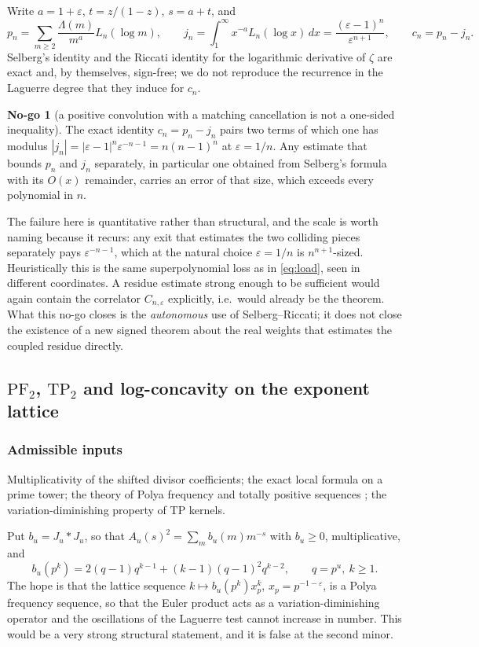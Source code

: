 \documentclass[11pt]{amsart}
\theoremstyle{definition}
\theoremstyle{remark}
\theoremstyle{definition}
\newtheorem{nogo}{No-go}[section]
\newcommand{\eps}{\varepsilon}
\begin{document}
Write $a=1+\eps$, $t=z/(1-z)$, $s=a+t$, and
\[
   p_n=\sum_{m\ge2}\frac{\Lambda(m)}{m^a}L_n(\log m),\qquad
   j_n=\int_1^\infty x^{-a}L_n(\log x)\,dx=\frac{(\eps-1)^n}{\eps^{n+1}},\qquad
   c_n=p_n-j_n .
\]
Selberg's identity and the Riccati identity for the logarithmic derivative of $\zeta$ are exact
and, by themselves, sign-free; we do not reproduce the recurrence in the Laguerre degree that
they induce for $c_n$.

\begin{nogo}[a positive convolution with a matching cancellation is not a one-sided
inequality]\label{ng:selberg}
The exact identity $c_n=p_n-j_n$ pairs two terms of which one has modulus
$|j_n|=|\eps-1|^n\eps^{-n-1}=n(n-1)^n$ at $\eps=1/n$. Any estimate that bounds $p_n$ and $j_n$
separately, in particular one obtained from Selberg's formula with its $O(x)$ remainder, carries
an error of that size, which exceeds every polynomial in $n$.
\end{nogo}

\noindent The failure here is quantitative rather than structural, and the scale is worth naming
because it recurs: any exit that estimates the two colliding pieces separately pays
$\eps^{-n-1}$, which at the natural choice $\eps=1/n$ is $n^{n+1}$-sized. Heuristically this is
the same superpolynomial loss as in \eqref{eq:load}, seen in different coordinates. A residue
estimate strong enough to be sufficient would again contain the correlator $C_{n,\eps}$
explicitly, i.e.\ would already be the theorem. What this no-go closes is the \emph{autonomous}
use of Selberg--Riccati; it does not close the existence of a new signed theorem about the real
weights that estimates the coupled residue directly.

\subsection{$\mathrm{PF}_2$, $\mathrm{TP}_2$ and log-concavity on the exponent lattice}
\label{sec:pf2}

\subsubsection*{Admissible inputs}
Multiplicativity of the shifted divisor coefficients; the exact local formula on a prime tower;
the theory of Polya frequency and totally positive sequences \cite{Karlin,Schoenberg,BrandenSurvey};
the variation-diminishing property of $\mathrm{TP}$ kernels.

Put $b_u=J_u*J_u$, so that $A_u(s)^2=\sum_mb_u(m)m^{-s}$ with $b_u\ge0$, multiplicative, and
\begin{equation}\label{eq:bu-tower}
   b_u(p^k)=2(q-1)q^{k-1}+(k-1)(q-1)^2q^{k-2},\qquad q=p^u,\ k\ge1 .
\end{equation}
The hope is that the lattice sequence $k\mapsto b_u(p^k)x_p^k$, $x_p=p^{-1-\eps}$, is a Polya
frequency sequence, so that the Euler product acts as a variation-diminishing operator and the
oscillations of the Laguerre test cannot increase in number. This would be a very strong
structural statement, and it is false at the second minor.
\end{document}
